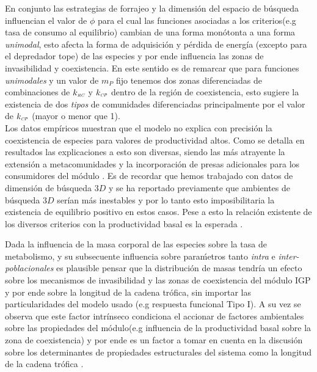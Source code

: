 En conjunto las estrategias de forrajeo y la dimensi\'on del espacio de b\'usqueda influencian el valor de $\phi$ para el cual las funciones asociadas a los criterios(e.g tasa de consumo al equilibrio) cambian de una forma mon\'otonta a una forma \emph{unimodal}, esto afecta la forma de adquisici\'on y p\'erdida de energ\'ia (excepto para el depredador tope) de las especies y por ende influencia las zonas de invasibilidad y coexistencia. En este sentido es de remarcar que para funciones \emph{unimodales} y un valor de $m_P$ fijo tenemos dos zonas diferenciadas de combinaciones de $k_{\textit{\tiny RC}}$ y $k_{\textit{\tiny CP}}$ dentro de la regi\'on de coexistencia, esto sugiere la existencia de dos \emph{tipos} de comunidades diferenciadas principalmente por el valor de $k_{\textit{\tiny CP}}$ (mayor o menor que 1). \\

Los datos emp\'iricos muestran que el modelo no explica con precisi\'on la coexistencia de especies para valores de productividad altos. Como se detalla en resultados las explicaciones a esto son diversas, siendo las m\'as atrayente la extensi\'on a metacomunidades\citep{Takimoto2012} y la incorporaci\'on de presas adicionales para los consumidores del m\'odulo \citep{holt2007alternative}. Es de recordar que hemos trabajado con datos de dimensi\'on de b\'usqueda $3D$ y se ha reportado previamente que ambientes de b\'usqueda $3D$ ser\'ian m\'as inestables \citep{pawar2012dimensionality} y por lo tanto esto imposibilitaria la existencia de equilibrio positivo en estos casos. Pese a esto la relaci\'on existente de los diversos criterios con la productividad basal es la esperada \citet{holt1997theoretical,diehl2000effects}.

Dada la influencia de la masa corporal de las especies sobre la tasa de metabolismo, y su subsecuente influencia sobre para\'metros tanto \emph{intra} e \emph{inter-poblacionales} \citep{savage2004predominance,brown2004toward,west1997general,savage2004effects,pawar2012dimensionality,mcgill2006allometric,peters1986ecological,kiltie2000scaling,yodzis1992body} es plausible pensar que la distribuci\'on de masas tendr\'ia un efecto sobre los mecanismos de invasibilidad y las zonas de coexistencia del m\'odulo IGP y por ende sobre la longitud de la cadena tr\'ofica, sin importar las particularidades del modelo usado (e.g respuesta funcional Tipo I). A su vez se observa que este factor intr\'inseco condiciona el accionar de factores ambientales sobre las propiedades del m\'odulo(e.g influencia de la productividad basal sobre la zona de coexistencia) y por ende es un factor a tomar en cuenta en la discusi\'on sobre los determinantes de propiedades estructurales del sistema como la longitud de la cadena tr\'ofica \citep{takimoto2013environmental,post2002long}.





